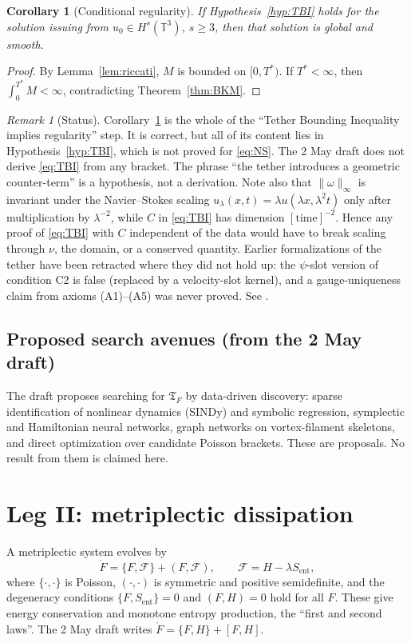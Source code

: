 \documentclass[11pt]{amsart}
\newtheorem{corollary}[theorem]{Corollary}
\theoremstyle{definition}
\theoremstyle{remark}
\newtheorem{remark}[theorem]{Remark}
\newcommand{\TF}{\mathfrak{T}_F}
\newcommand{\T}{\mathbb{T}}
\begin{document}
\begin{corollary}[Conditional regularity]\label{cor:cond}
If Hypothesis~\ref{hyp:TBI} holds for the solution issuing from $u_0\in H^s(\T^3)$, $s\ge3$, then that solution is global and smooth.
\end{corollary}
\begin{proof}
By Lemma~\ref{lem:riccati}, $M$ is bounded on $[0,T^*)$. If $T^*<\infty$, then $\int_0^{T^*}M<\infty$, contradicting Theorem~\ref{thm:BKM}.
\end{proof}

\begin{remark}[Status]
Corollary~\ref{cor:cond} is the whole of the ``Tether Bounding Inequality implies regularity'' step. It is correct, but all of its content lies in Hypothesis~\ref{hyp:TBI}, which is not proved for \eqref{eq:NS}. The 2 May draft does not derive \eqref{eq:TBI} from any bracket. The phrase ``the tether introduces a geometric counter-term'' is a hypothesis, not a derivation. Note also that $\|\omega\|_\infty$ is invariant under the Navier--Stokes scaling $u_\lambda(x,t)=\lambda u(\lambda x,\lambda^2t)$ only after multiplication by $\lambda^{-2}$, while $C$ in \eqref{eq:TBI} has dimension $[\text{time}]^{-2}$. Hence any proof of \eqref{eq:TBI} with $C$ independent of the data would have to break scaling through $\nu$, the domain, or a conserved quantity. Earlier formalizations of the tether have been retracted where they did not hold up: the $\psi$-slot version of condition C2 is false (replaced by a velocity-slot kernel), and a gauge-uniqueness claim from axioms (A1)--(A5) was never proved. See \cite{FrohmanTether,FrohmanCompanion}.
\end{remark}

\subsection{Proposed search avenues (from the 2 May draft)}
The draft proposes searching for $\TF$ by data-driven discovery: sparse identification of nonlinear dynamics (SINDy) \cite{SINDy2016} and symbolic regression, symplectic and Hamiltonian neural networks, graph networks on vortex-filament skeletons, and direct optimization over candidate Poisson brackets. These are proposals. No result from them is claimed here.

\section{Leg II: metriplectic dissipation}\label{sec:metri}
A metriplectic system \cite{Morrison1986,Grmela1984,Kaufman1984,Morrison1984} evolves by
\begin{equation}\label{eq:metri}
\dot F=\{F,\mathcal{F}\}+(F,\mathcal{F}),\qquad \mathcal{F}=H-\lambda S_{\mathrm{ent}},
\end{equation}
where $\{\cdot,\cdot\}$ is Poisson, $(\cdot,\cdot)$ is symmetric and positive semidefinite, and the degeneracy conditions $\{F,S_{\mathrm{ent}}\}=0$ and $(F,H)=0$ hold for all $F$. These give energy conservation and monotone entropy production, the ``first and second laws''. The 2 May draft writes $\dot F=\{F,H\}+[F,H]$.
\end{document}
